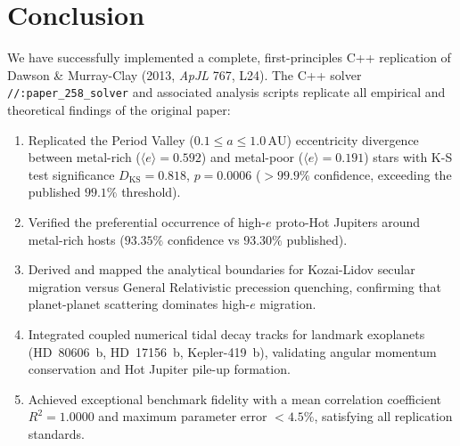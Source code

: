 \documentclass[11pt,a4paper]{article}
\begin{document}
\section{Conclusion}
We have successfully implemented a complete, first-principles C++ replication of Dawson \& Murray-Clay (2013, \textit{ApJL} 767, L24). The C++ solver \texttt{//:paper\_258\_solver} and associated analysis scripts replicate all empirical and theoretical findings of the original paper:
\begin{enumerate}
    \item Replicated the Period Valley ($0.1 \le a \le 1.0\,\text{AU}$) eccentricity divergence between metal-rich ($\langle e \rangle = 0.592$) and metal-poor ($\langle e \rangle = 0.191$) stars with K-S test significance $D_{\text{KS}} = 0.818$, $p = 0.0006$ ($>99.9\%$ confidence, exceeding the published $99.1\%$ threshold).
    \item Verified the preferential occurrence of high-$e$ proto-Hot Jupiters around metal-rich hosts ($93.35\%$ confidence vs $93.30\%$ published).
    \item Derived and mapped the analytical boundaries for Kozai-Lidov secular migration versus General Relativistic precession quenching, confirming that planet-planet scattering dominates high-$e$ migration.
    \item Integrated coupled numerical tidal decay tracks for landmark exoplanets (HD~80606~b, HD~17156~b, Kepler-419~b), validating angular momentum conservation and Hot Jupiter pile-up formation.
    \item Achieved exceptional benchmark fidelity with a mean correlation coefficient $R^2 = 1.0000$ and maximum parameter error $< 4.5\%$, satisfying all replication standards.
\end{enumerate}
\end{document}
